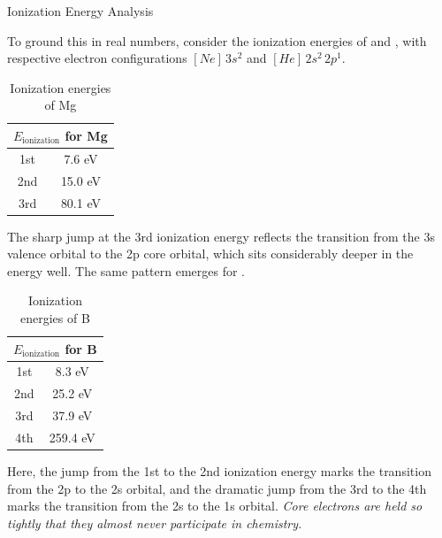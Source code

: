 \documentclass[10pt]{article}
\begin{document}
    \begin{core}{Ionization Energy Analysis}

      To ground this in real numbers, consider the ionization energies of  and , with respective electron configurations $[Ne]\,3s^2$ and $[He]\,2s^2\,2p^1$.

      \begin{table}[H]
        \centering
        \begin{tabular}{cc}
          \hline
          \multicolumn{2}{c}{$E_{\text{ionization}}$ for Mg} \\
          \hline
          1st & 7.6 eV \\
          2nd & 15.0 eV \\
          3rd & 80.1 eV \\
          \hline
        \end{tabular}
        \caption{Ionization energies of Mg}
        \label{tab:pholder1}
      \end{table}

      The sharp jump at the 3rd ionization energy reflects the transition from the 3s valence orbital to the 2p core orbital, which sits considerably deeper in the energy well. The same pattern emerges for .

      \begin{table}[H]
        \centering
        \begin{tabular}{cc}
          \hline
          \multicolumn{2}{c}{$E_{\text{ionization}}$ for B} \\
          \hline
          1st & 8.3 eV \\
          2nd & 25.2 eV \\
          3rd & 37.9 eV \\
          4th & 259.4 eV \\
          \hline
        \end{tabular}
        \caption{Ionization energies of B}
        \label{tab:pholder2}
      \end{table}

      Here, the jump from the 1st to the 2nd ionization energy marks the transition from the 2p to the 2s orbital, and the dramatic jump from the 3rd to the 4th marks the transition from the 2s to the 1s orbital. \textit{Core electrons are held so tightly that they almost never participate in chemistry.}

    \end{core}
\end{document}

